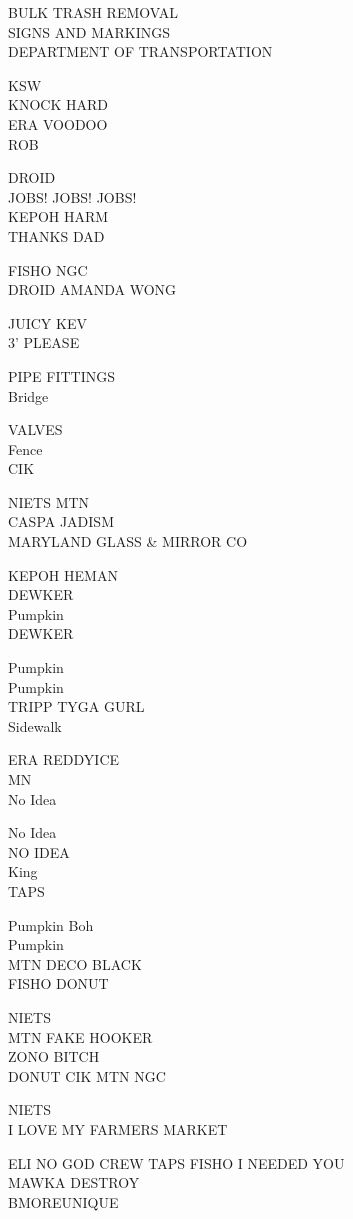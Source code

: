 \documentclass[10pt,letterpaper]{article}
\begin{document}
BULK TRASH REMOVAL\\
SIGNS AND MARKINGS\\
DEPARTMENT OF TRANSPORTATION

KSW\\
KNOCK HARD\\
ERA VOODOO\\
ROB

DROID\\
JOBS! JOBS! JOBS!\\
KEPOH HARM\\
THANKS DAD

FISHO NGC\\
DROID AMANDA WONG

JUICY KEV\\
3' PLEASE

PIPE FITTINGS\\
Bridge

VALVES\\
Fence\\
CIK

NIETS MTN\\
CASPA JADISM\\
MARYLAND GLASS \& MIRROR CO

KEPOH HEMAN\\
DEWKER\\
Pumpkin\\
DEWKER

Pumpkin\\
Pumpkin\\
TRIPP TYGA GURL\\
Sidewalk

ERA REDDYICE\\
MN\\
No Idea

No Idea\\
NO IDEA\\
King\\
TAPS

Pumpkin Boh\\
Pumpkin\\
MTN DECO BLACK\\
FISHO DONUT

NIETS\\
MTN FAKE HOOKER\\
ZONO BITCH\\
DONUT CIK MTN NGC

NIETS\\
I LOVE MY FARMERS MARKET

ELI NO GOD CREW TAPS FISHO I NEEDED YOU\\
MAWKA DESTROY\\
BMOREUNIQUE
\end{document}
